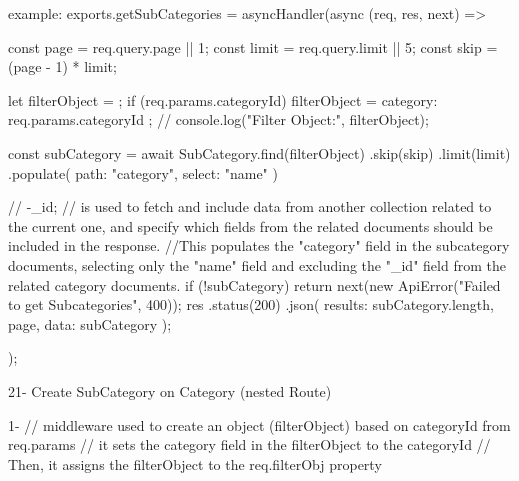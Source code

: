                            example:
                            exports.getSubCategories = asyncHandler(async (req, res, next) => {
                                            const page = req.query.page || 1;
                                            const limit = req.query.limit || 5;
                                            const skip = (page - 1) * limit;

                                            let filterObject = {};
                                            if (req.params.categoryId) {
                                                filterObject = { category: req.params.categoryId };
                                            }
                                            // console.log("Filter Object:", filterObject);

                                            const subCategory = await SubCategory.find(filterObject)
                                                .skip(skip)
                                                .limit(limit)
                                                .populate({ path: "category", select: "name" })

                                            // -_id;
                                            // is used to fetch and include data from another collection related to the current one, and specify which fields from the related documents should be included in the response.
                                            //This populates the "category" field in the subcategory documents, selecting only the "name" field and excluding the "_id" field from the related category documents.
                                            if (!subCategory) {
                                                return next(new ApiError("Failed to get Subcategories", 400));
                                            }
                                            res
                                                .status(200)
                                                .json({ results: subCategory.length, page, data: subCategory });
                                        });


21- Create SubCategory on Category (nested Route)

                1- // middleware used to create an object (filterObject) based on categoryId from req.params
                    //  it sets the category field in the filterObject to the categoryId
                    // Then, it assigns the filterObject to the req.filterObj property

